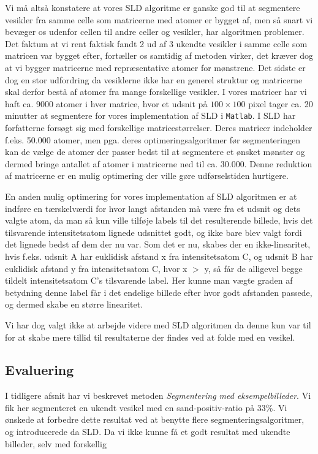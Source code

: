 Vi må altså konstatere at vores SLD algoritme er ganske god til at segmentere vesikler fra samme celle som matricerne med atomer er bygget af, men så snart vi bevæger os udenfor cellen til andre celler og vesikler, har algoritmen problemer. Det faktum at vi rent faktisk fandt 2 ud af 3 ukendte vesikler i samme celle som matricen var bygget efter, fortæller os samtidig af metoden virker, det kræver dog at vi bygger matricerne med repræsentative atomer for mønstrene. Det sidste er dog en stor udfordring da vesiklerne ikke har en generel struktur og matricerne skal derfor bestå af atomer fra mange forskellige vesikler. I vores matricer har vi haft ca. 9000 atomer i hver matrice, hvor et udsnit på $100\times100$ pixel tager ca. 20 minutter at segmentere for vores implementation af SLD i \texttt{Matlab}. I SLD har forfatterne forsøgt sig med forskellige matricestørrelser. Deres matricer indeholder f.eks. 50.000 atomer, men pga. deres optimeringsalgoritmer før segmenteringen kan de vælge de atomer der passer bedst til at segmentere et ønsket mønster og dermed bringe antallet af atomer i matricerne ned til ca. 30.000. Denne reduktion af matricerne er en mulig optimering der ville gøre udførselstiden hurtigere. 

En anden mulig optimering for vores implementation af SLD algoritmen er at indføre en tærskelværdi for hvor langt afstanden må være fra et udsnit og dets valgte atom, da man så kun ville tilføje labels til det resulterende billede, hvis det tilsvarende intensitetsatom lignede udsnittet godt, og ikke bare blev valgt fordi det lignede bedst af dem der nu var. Som det er nu, skabes der en ikke-linearitet, hvis f.eks. udsnit A har euklidisk afstand x fra intensitetsatom C, og udsnit B har euklidisk afstand y fra intensitetsatom C, hvor x $>$ y, så får de alligevel begge tildelt intensitetsatom C's tilsvarende label. Her kunne man vægte graden af betydning denne label får i det endelige billede efter hvor godt afstanden passede, og dermed skabe en større linearitet. 

Vi har dog valgt ikke at arbejde videre med SLD algoritmen da denne kun var til for at skabe mere tillid til resultaterne der findes ved at folde med en vesikel. \\

\subsection{Evaluering}
I tidligere afsnit har vi beskrevet metoden \emph{Segmentering med eksempelbilleder}. Vi fik her segmenteret en ukendt vesikel med en sand-positiv-ratio på 33\%. Vi ønskede at forbedre dette resultat ved at benytte flere segmenteringsalgoritmer, og introducerede da SLD. Da vi ikke kunne få et godt resultat med ukendte billeder, selv med forskellig 


